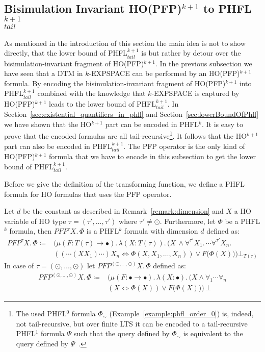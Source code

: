 \subsection{Bisimulation Invariant HO(PFP)$^{k+1}$ to PHFL$^{k+1}_{tail}$}\label{subsec:bisimulationInvariantHopfptoPhfl}

As mentioned in the introduction of this section the main idea is not to show directly, that the 
lower bound of PHFL$^{k+1}_{tail}$ is  but rather by detour over the 
bisimulation-invariant fragment of HO(PFP)$^{k+1}$. In the previous subsection we have seen 
 that a DTM in $k$-EXPSPACE can be performed by an HO(PFP)$^{k+1}$
formula. By encoding the bisimulation-invariant fragment of HO(PFP)$^{k+1}$ into
PHFL$^{k+1}_{tail}$ combined with the knowledge that $k$-EXPSPACE is captured by 
HO(PFP)$^{k+1}$ leads to the lower bound of PHFL$^{k+1}_{tail}$. In
Section~\ref{sec:existential_quantifiers_in_phfl} and Section~\ref{sec:lowerBoundOfPhfl} we 
have shown that the HO$^{k+1}$ part can be encoded in PHFL$^k$. It is easy to prove that the 
encoded formulas are all tail-recursive\footnote{The used PHFL$^0$ formula $\Phi_\sim$ (Example~\ref{example:phfl_order_0}) is, indeed, not tail-recursive, but over finite LTS it can be  encoded to a tail-recursive PHFL$^1$ formula $\Psi$ such that the query defined by $\Phi_\sim$ is equivalent to the query defined by $\Psi$~\cite{lange2014capturing_long}.}. It follows that the HO$^{k+1}$ part can also be 
encoded in  PHFL$^{k+1}_{tail}$. The PFP operator is the only kind of HO(PFP)$^{k+1}$ formula 
that we have to encode in this subsection to get the lower bound of PHFL$^{k+1}_{tail}$.

Before we give the definition of the transforming function, we define a PHFL formula for HO formulas that uses the PFP operator.

\begin{definition}
Let $d$ be the constant as described in Remark~\ref{remark:dimension} and $X$ a HO variable of HO type $\tau = (\tau', \dots, \tau')$ where $\tau' \neq \odot$. Furthermore, let
    $\Phi$ be a PHFL$^k$
    formula, then $PFP^\tau X.\,\Phi$
    is a PHFL$^k$ formula with dimension $d$ defined as:
    \begin{align*}
     PFP^\tau X. \, \Phi \coloneqq &\Big(\mu (F \colon T(\tau) \rightarrow \bullet).\,\lambda (X \colon T(\tau)).\, \big(X\,\wedge \forall^{\tau'}X_1.\, \dotsb \forall^{\tau'}X_n.\, \\&( (\dotsb (X X_1) \dotsb) X_n \Leftrightarrow \Phi(X, X_1, \dots, X_n) ) \vee F(\Phi(X)\big)\Big)\bot_{T(\tau)}
\end{align*}    
    In case of $\tau = (\odot, \dots, \odot)$ let $PFP^{(\odot, \dots, \odot)} X.\,\Phi$ defined as:
    \begin{align*}
    PFP^{(\odot, \dots, \odot)} X.\,\Phi \coloneqq & \Big(\mu (F \colon \bullet \rightarrow \bullet).\,\lambda (X \colon \bullet).\, \big(X \wedge \forall_1 \dotsb \forall_n \\&(X \Leftrightarrow \Phi(X)) \vee F(\Phi(X)\big)\Big)\,\bot 
    \end{align*}
\end{definition}

